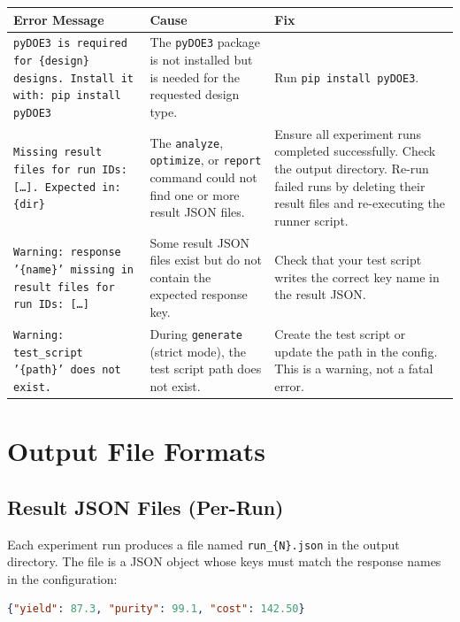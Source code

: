 \documentclass[11pt]{book}
\begin{document}
\begin{longtable}{@{}p{5.5cm}p{5.5cm}p{5.5cm}@{}}
\toprule
\textbf{Error Message} & \textbf{Cause} & \textbf{Fix} \\
\midrule
\endhead

\texttt{pyDOE3 is required for \{design\} designs. Install it with: pip install pyDOE3} &
The \texttt{pyDOE3} package is not installed but is needed for the requested design type. &
Run \texttt{pip install pyDOE3}. \\
\midrule

\texttt{Missing result files for run IDs: [\ldots]. Expected in: \{dir\}} &
The \texttt{analyze}, \texttt{optimize}, or \texttt{report} command could not find one or more result JSON files. &
Ensure all experiment runs completed successfully. Check the output directory. Re-run failed runs by deleting their result files and re-executing the runner script. \\
\midrule

\texttt{Warning: response '\{name\}' missing in result files for run IDs: [\ldots]} &
Some result JSON files exist but do not contain the expected response key. &
Check that your test script writes the correct key name in the result JSON. \\
\midrule

\texttt{Warning: test\_script '\{path\}' does not exist.} &
During \texttt{generate} (strict mode), the test script path does not exist. &
Create the test script or update the path in the config. This is a warning, not a fatal error. \\

\bottomrule
\end{longtable}


\chapter{Output File Formats}
\label{app:formats}

\section{Result JSON Files (Per-Run)}

Each experiment run produces a file named \texttt{run\_\{N\}.json} in the output directory. The file is a JSON object whose keys must match the response names in the configuration:

\begin{lstlisting}[language=json]
{"yield": 87.3, "purity": 99.1, "cost": 142.50}
\end{lstlisting}
\end{document}

